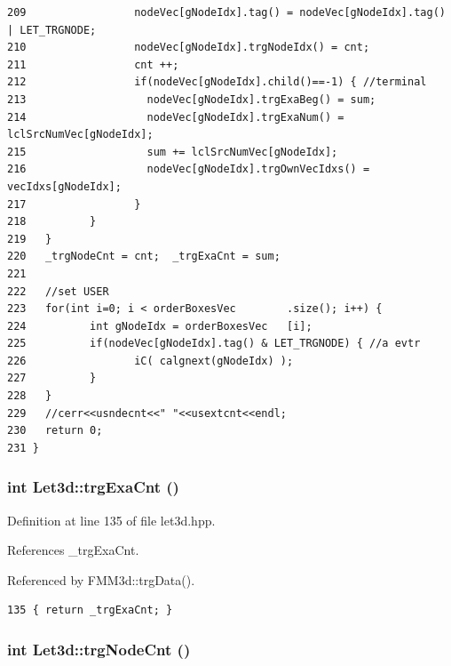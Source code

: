 \begin{verbatim}
209                 nodeVec[gNodeIdx].tag() = nodeVec[gNodeIdx].tag() | LET_TRGNODE;
210                 nodeVec[gNodeIdx].trgNodeIdx() = cnt;
211                 cnt ++;
212                 if(nodeVec[gNodeIdx].child()==-1) { //terminal
213                   nodeVec[gNodeIdx].trgExaBeg() = sum;
214                   nodeVec[gNodeIdx].trgExaNum() = lclSrcNumVec[gNodeIdx];
215                   sum += lclSrcNumVec[gNodeIdx];
216                   nodeVec[gNodeIdx].trgOwnVecIdxs() = vecIdxs[gNodeIdx];
217                 }
218          }
219   }
220   _trgNodeCnt = cnt;  _trgExaCnt = sum;
221   
222   //set USER
223   for(int i=0; i < orderBoxesVec        .size(); i++) {
224          int gNodeIdx = orderBoxesVec   [i];
225          if(nodeVec[gNodeIdx].tag() & LET_TRGNODE) { //a evtr           
226                 iC( calgnext(gNodeIdx) );
227          }
228   }
229   //cerr<<usndecnt<<" "<<usextcnt<<endl;
230   return 0;
231 }
\end{verbatim}\normalsize 


\subsubsection{\setlength{\rightskip}{0pt plus 5cm}int Let3d::trg\-Exa\-Cnt ()\hspace{0.3cm}{\tt  [inline]}}\label{classLet3d_c06dcfc8d199d27512ad45c639d55c70_c06dcfc8d199d27512ad45c639d55c70}




Definition at line 135 of file let3d.hpp.

References \_\-trg\-Exa\-Cnt.

Referenced by FMM3d::trg\-Data().

\footnotesize\begin{verbatim}135 { return _trgExaCnt; }
\end{verbatim}\normalsize 


\subsubsection{\setlength{\rightskip}{0pt plus 5cm}int Let3d::trg\-Node\-Cnt ()\hspace{0.3cm}{\tt  [inline]}}\label{classLet3d_a7a59ac55ae453d50e9865a675f17cb9_a7a59ac55ae453d50e9865a675f17cb9}




